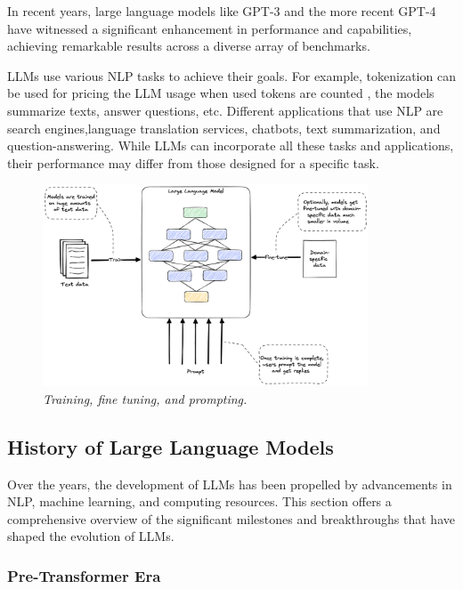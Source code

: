 In recent years, large language models like GPT-3 and the more recent GPT-4 have witnessed a significant enhancement in performance and capabilities, achieving remarkable results across a diverse array of benchmarks.

LLMs use various NLP tasks to achieve their goals. For example, tokenization can be
used for pricing the LLM usage when used tokens are counted \cite{openai:tokens}, the models summarize texts, answer questions, etc. Different applications that use NLP are search engines,language translation services, chatbots, text summarization, and question-answering.
While LLMs can incorporate all these tasks and applications, their performance may differ
from those designed for a specific task.

\begin{figure}[H]
    \centering
    \includegraphics[width=\textwidth,height=6cm,keepaspectratio=true]{llms.png}
    \caption{
        \it{Training, fine tuning, and prompting.}
    }
\end{figure}

\subsection{History of Large Language Models}

Over the years, the development of LLMs has been propelled by advancements in NLP, machine learning, and computing resources. This section offers a comprehensive overview of the significant milestones and breakthroughs that have shaped the evolution of LLMs.

\subsubsection*{Pre-Transformer Era}

